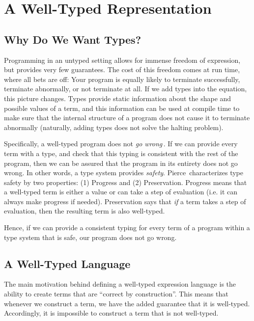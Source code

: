 \section{A Well-Typed Representation}
\label{sec:a-well-typed-expression-language}

\subsection{Why Do We Want Types?}
Programming in an untyped setting allows for immense freedom of expression, but provides very few guarantees. The cost of this freedom comes at run time, where all bets are off: Your program is equally likely to terminate successfully, terminate abnormally, or not terminate at all. If we add types into the equation, this picture changes. Types provide static information about the shape and possible values of a term, and this information can be used at compile time to make sure that the internal structure of a program does not cause it to terminate abnormally (naturally, adding types does not solve the halting problem).

Specifically, a well-typed program does not \emph{go wrong}\,\cite{Milner78atheory}. If we can provide every term with a type, and check that this typing is consistent with the rest of the program, then we can be assured that the program in its entirety does not go wrong. In other words, a type system provides \emph{safety}. Pierce\,\cite[Section~8.3]{Pierce:TypeSystems} characterizes type safety by two properties: (1) Progress and (2) Preservation. Progress means that a well-typed term is either a value or can take a step of evaluation (i.e. it can always make progress if needed). Preservation says that \emph{if} a term takes a step of evaluation, then the resulting term is also well-typed.

Hence, if we can provide a consistent typing for every term of a program within a type system that is safe, our program does not go wrong. 

\subsection{A Well-Typed Language}
The main motivation behind defining a well-typed expression language is the ability to create terms that are ``correct by construction''. This means that whenever we construct a term, we have the added guarantee that it is well-typed. Accordingly, it is impossible to construct a term that is not well-typed.

